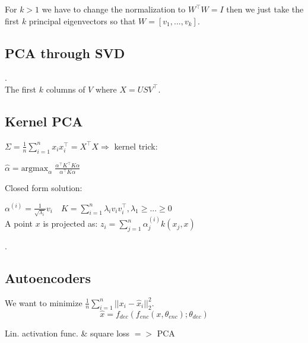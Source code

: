 For $k > 1$ we have to change the normalization to $W^\top W = I$ then we just take the first $k$ principal eigenvectors so that $W = [v_1, ..., v_k]$.

\subsection*{PCA through SVD}
\color{White} . \color {Black}\\[-10pt]
The first $k$ columns of $V$ where $X = U S V^\top$.

\subsection*{Kernel PCA}

$\Sigma = \frac{1}{n} \sum_{i=1}^n x_i x_i^\top = X^\top X \Rightarrow$  kernel trick:

\qquad \qquad $\hat{\alpha} = \text{argmax}_\alpha \; \frac{\alpha^\top K^\top K \alpha}{\alpha^\top K \alpha}$

Closed form solution:

$\alpha^{(i)} = \frac{1}{\sqrt{\lambda_i}}v_i \quad K = \sum_{i = 1}^n \lambda_i v_i v_i^\top, \lambda_1 \geq ... \geq 0$\\[-6pt]

A point $x$ is projected as:
$z_i = \sum_{j=1}^n \alpha_j^{(i)} k(x_j, x)$

\color{White} . \color {Black}\\[-18pt]

\subsection*{Autoencoders}

We want to minimize $\frac{1}{n}\sum_{i=1}^n ||x_i - \hat{x}_i||_2^2$.
$$\hat{x} = f_{dec}(f_{enc}(x, \theta_{enc}); \theta_{dec})$$

Lin. activation func. \& square loss $=>$ PCA